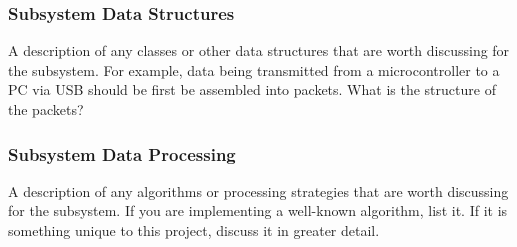 \subsubsection{Subsystem Data Structures}
A description of any classes or other data structures that are worth discussing for the subsystem. For example, data being transmitted from a microcontroller to a PC via USB should be first be assembled into packets. What is the structure of the packets?

\subsubsection{Subsystem Data Processing}
A description of any algorithms or processing strategies that are worth discussing for the subsystem. If you are implementing a well-known algorithm, list it. If it is something unique to this project, discuss it in greater detail.



